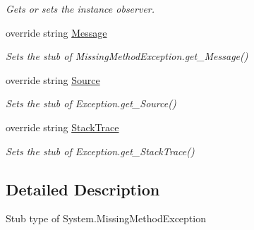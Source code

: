 \begin{DoxyCompactItemize}
\begin{DoxyCompactList}\small\item\em Gets or sets the instance observer.\end{DoxyCompactList}\item 
override string \hyperlink{class_system_1_1_fakes_1_1_stub_missing_method_exception_ad2ff619e4da76bb5021c168c6cd793f9}{Message}
\begin{DoxyCompactList}\small\item\em Sets the stub of Missing\-Method\-Exception.\-get\-\_\-\-Message()\end{DoxyCompactList}\item 
override string \hyperlink{class_system_1_1_fakes_1_1_stub_missing_method_exception_a8e285963b095d11daa446fc29f036ecb}{Source}
\begin{DoxyCompactList}\small\item\em Sets the stub of Exception.\-get\-\_\-\-Source()\end{DoxyCompactList}\item 
override string \hyperlink{class_system_1_1_fakes_1_1_stub_missing_method_exception_ad818e1d70ce851bc55c067e3eb718e4a}{Stack\-Trace}
\begin{DoxyCompactList}\small\item\em Sets the stub of Exception.\-get\-\_\-\-Stack\-Trace()\end{DoxyCompactList}\end{DoxyCompactItemize}


\subsection{Detailed Description}
Stub type of System.\-Missing\-Method\-Exception



